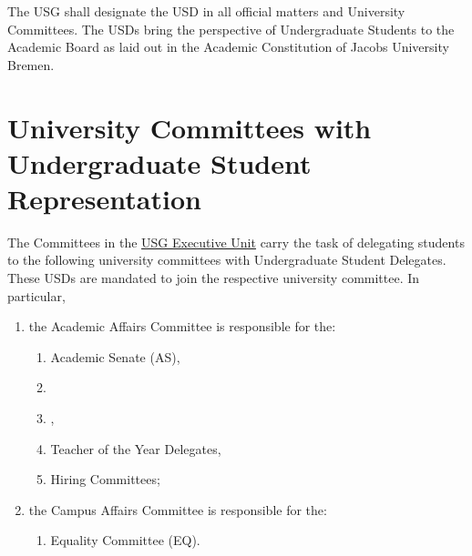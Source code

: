 
The USG shall designate the \ac{USD} in all official matters and University Committees. The USDs bring the perspective of Undergraduate Students to the Academic Board as laid out in the Academic Constitution of Jacobs University Bremen. 

\section{University Committees with Undergraduate Student Representation}
The Committees in the \hyperref[USGexecutiveUnitDef]{USG Executive Unit} carry the task of delegating students to the following university committees with Undergraduate Student Delegates. These USDs are mandated to join the respective university committee. In particular,
\begin{enumerate}
\item the Academic Affairs Committee is responsible for  the:
\begin{enumerate}
    \item Academic Senate (AS),
    \item {}
    \item {},
    \item Teacher of the Year Delegates,
    \item Hiring Committees;
\end{enumerate}

\item the Campus Affairs Committee is responsible for  the:
\begin{enumerate}
    \item Equality Committee (EQ).
\end{enumerate}
\end{enumerate}

